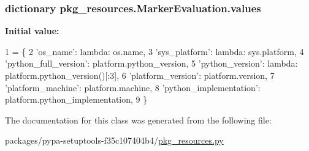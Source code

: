 \subsubsection[{values}]{\setlength{\rightskip}{0pt plus 5cm}dictionary pkg\+\_\+resources.\+Marker\+Evaluation.\+values\hspace{0.3cm}{\ttfamily [static]}}\label{classpkg__resources_1_1MarkerEvaluation_acb8200b78de1d34b6d0852e1f7fa5ffd}
{\bfseries Initial value\+:}
\begin{DoxyCode}
1 = \{
2         \textcolor{stringliteral}{'os\_name'}: \textcolor{keyword}{lambda}: os.name,
3         \textcolor{stringliteral}{'sys\_platform'}: \textcolor{keyword}{lambda}: sys.platform,
4         \textcolor{stringliteral}{'python\_full\_version'}: platform.python\_version,
5         \textcolor{stringliteral}{'python\_version'}: \textcolor{keyword}{lambda}: platform.python\_version()[:3],
6         \textcolor{stringliteral}{'platform\_version'}: platform.version,
7         \textcolor{stringliteral}{'platform\_machine'}: platform.machine,
8         \textcolor{stringliteral}{'python\_implementation'}: platform.python\_implementation,
9     \}
\end{DoxyCode}


The documentation for this class was generated from the following file\+:\begin{DoxyCompactItemize}
\item 
packages/pypa-\/setuptools-\/f35c107404b4/\hyperlink{pkg__resources_8py}{pkg\+\_\+resources.\+py}\end{DoxyCompactItemize}
